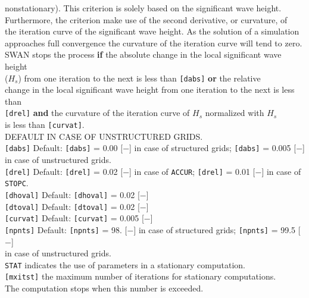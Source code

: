 \documentclass[12pt]{book}
\begin{document}
\begin{tabbing}
                  nonstationary). This criterion is solely based on the significant wave height.\\
                  Furthermore, the criterion make use of the second derivative, or curvature, of\\
                  the iteration curve of the significant wave height. As the solution of a simulation\\
                  approaches full convergence the curvature of the iteration curve will tend to zero.\\
                  SWAN stops the process {\bf if} the absolute change in the local significant wave height\\
                  ($H_s$) from one iteration to the next is less than {\tt [dabs]} {\bf or} the relative\\
                  change in the local significant wave height from one iteration to the next is less than\\
                  {\tt [drel]} {\bf and} the curvature of the iteration curve of $H_s$ normalized with $H_s$\\
                  is less than {\tt [curvat]}.\\
                  DEFAULT IN CASE OF UNSTRUCTURED GRIDS.\-\\
{\tt [dabs]}   \> Default: {\tt [dabs]} = 0.00 [$-$] in case of structured grids; {\tt [dabs]} = 0.005 [$-$]\+\\
                  in case of unstructured grids.\-\\
{\tt [drel]}   \> Default: {\tt [drel]} = 0.02 [$-$] in case of {\tt ACCUR}; {\tt [drel]} = 0.01 [$-$] in case of {\tt STOPC}.\\
{\tt [dhoval]} \> Default: {\tt [dhoval]} = 0.02 [$-$]\\
{\tt [dtoval]} \> Default: {\tt [dtoval]} = 0.02 [$-$]\\
{\tt [curvat]} \> Default: {\tt [curvat]} = 0.005 [$-$]\\
{\tt [npnts]}  \> Default: {\tt [npnts]} = 98. [$-$] in case of structured grids; {\tt [npnts]} = 99.5 [$-$]\+\\
                  in case of unstructured grids.\-\\
{\tt STAT}     \> indicates the use of parameters in a stationary computation.\\
{\tt [mxitst]} \> the maximum number of iterations for stationary computations.\+\\
                  The computation stops when this number is exceeded.\\

\end{tabbing}
\end{document}
